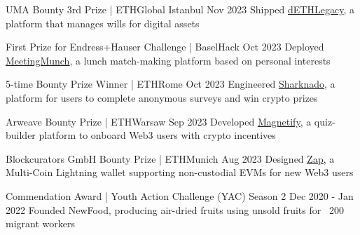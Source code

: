 
\begin{cventries}

  \cventry
    {UMA Bounty 3rd Prize | ETHGlobal Istanbul} %
    {} %
    {} %
    {Nov 2023} %
    {Shipped \href{https://ethglobal.com/showcase/deth-legacy-vq6ij}{\underline{dETHLegacy}}, a platform that manages wills for digital assets} %

  \cventry
    {First Prize for Endress+Hauser Challenge | BaselHack} %
    {} %
    {} %
    {Oct 2023} %
    {Deployed \href{https://github.com/noverney/randoms}{\underline{MeetingMunch}}, a lunch match-making platform based on personal interests} %

  \cventry
    {5-time Bounty Prize Winner | ETHRome} %
    {} %
    {} %
    {Oct 2023} %
    {Engineered \href{https://github.com/Squalome/sharknado}{\underline{Sharknado}}, a platform for users to complete anonymous surveys and win crypto prizes} %

  \cventry
    {Arweave Bounty Prize | ETHWarsaw} %
    {} %
    {} %
    {Sep 2023} %
    {Developed \href{https://devpost.com/software/dforms}{\underline{Magnetify}}, a quiz-builder platform to onboard Web3 users with crypto incentives} %

  \cventry
    {Blockcurators GmbH Bounty Prize | ETHMunich} %
    {} %
    {} %
    {Aug 2023} %
    {Designed \href{https://devfolio.co/projects/zap-c601}{\underline{Zap}}, a Multi-Coin Lightning wallet supporting non-custodial EVMs for new Web3 users} %

  \cventry
    {Commendation Award | Youth Action Challenge (YAC) Season 2} %
    {} %
    {} %
    {Dec 2020 - Jan 2022} %
    {Founded NewFood, producing air-dried fruits using unsold fruits for ~200 migrant workers} %


\end{cventries}
